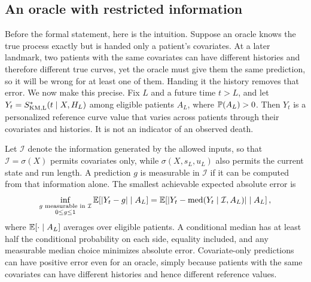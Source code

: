 \subsection{An oracle with restricted information}\label{sec:oracle}
Before the formal statement, here is the intuition. Suppose an oracle knows the true process exactly but is handed only a patient's covariates. At a later landmark, two patients with the same covariates can have different histories and therefore different true curves, yet the oracle must give them the same prediction, so it will be wrong for at least one of them. Handing it the history removes that error. We now make this precise. Fix $L$ and a future time $t>L$, and let $Y_t=S^*_{\rm KM,L}(t\mid X,H_L)$ among eligible patients $A_L$, where $\mathbb P(A_L)>0$. Then $Y_t$ is a personalized reference curve value that varies across patients through their covariates and histories. It is not an indicator of an observed death.

Let $\mathcal I$ denote the information generated by the allowed inputs, so that $\mathcal I=\sigma(X)$ permits covariates only, while $\sigma(X,s_L,u_L)$ also permits the current state and run length. A prediction $g$ is measurable in $\mathcal I$ if it can be computed from that information alone. The smallest achievable expected absolute error is
\begin{equation}\label{eq:floor}
\inf_{\substack{g\text{ measurable in }\mathcal I\\0\le g\le1}}\mathbb E[|Y_t-g|\mid A_L]
=\mathbb E\!\left[|Y_t-\operatorname{med}(Y_t\mid\mathcal I,A_L)|\mid A_L\right],
\end{equation}
where $\mathbb E[\cdot\mid A_L]$ averages over eligible patients. A conditional median has at least half the conditional probability on each side, equality included, and any measurable median choice minimizes absolute error. Covariate-only predictions can have positive error even for an oracle, simply because patients with the same covariates can have different histories and hence different reference values.

